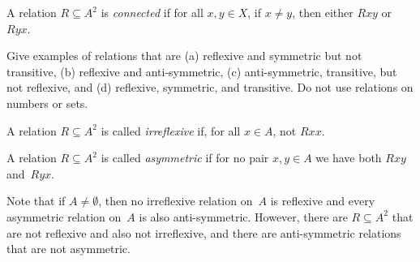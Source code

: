 \documentclass[../../../include/open-logic-section]{subfiles}
\begin{document}
\begin{defn}[Connectivity]
A relation $R \subseteq A^2$ is \emph{connected} if for all $x,y\in
X$, if $x \neq y$, then either $Rxy$ or~$Ryx$.
\end{defn}

\begin{prob}
Give examples of relations that are (a) reflexive and symmetric but
not transitive, (b) reflexive and anti-symmetric, (c) anti-symmetric,
transitive, but not reflexive, and (d) reflexive, symmetric, and
transitive.  Do not use relations on numbers or sets.
\end{prob} 
 
\begin{defn}[Irreflexivity]
A relation $R \subseteq A^2$ is called \emph{irreflexive} if, for all $x \in
A$, not $Rxx$. 
\end{defn}

\begin{defn}[Asymmetry]
A relation $R \subseteq A^2$ is called \emph{asymmetric} if for no pair $x,y\in
A$ we have both $Rxy$ and~$Ryx$. 
\end{defn}

Note that if $A \neq \emptyset$, then no irreflexive relation on~$A$
is reflexive and every asymmetric relation on~$A$ is also
anti-symmetric. However, there are $R \subseteq A^2$ that are not
reflexive and also not irreflexive, and there are anti-symmetric
relations that are not asymmetric. 
\end{document}
